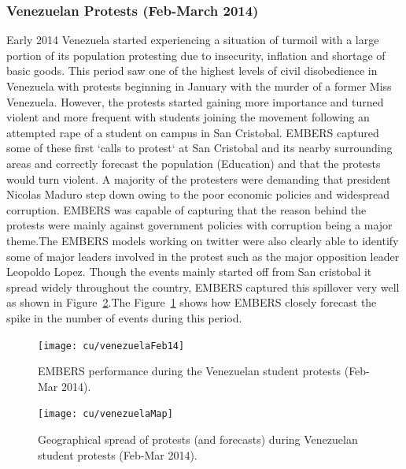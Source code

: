 \subsubsection*{Venezuelan Protests (Feb-March 2014)}
Early 2014 Venezuela started experiencing a situation of turmoil with a
large portion of its population protesting due to insecurity, inflation
and shortage of basic goods. This period saw one of the highest levels of
civil disobedience in Venezuela with protests beginning in January with the murder
of a former Miss Venezuela. However, the protests started gaining more importance
 and turned violent and more frequent with students joining the movement following an
attempted rape of a student on campus in San Cristobal. EMBERS captured
some of these first `calls to protest` at San Cristobal and its nearby surrounding areas
 and correctly forecast the population (Education) and that the protests would turn violent.
A majority of the protesters were demanding that president Nicolas Maduro step down owing
to the poor economic policies and widespread corruption. EMBERS was capable of capturing
that the reason behind the protests were mainly against government policies with corruption being
a major theme.The EMBERS models working on twitter were also clearly able to identify some of major
leaders involved in the protest such as the major opposition leader Leopoldo Lopez.
Though the events mainly started off from San cristobal it spread widely throughout the country, EMBERS
captured this spillover very well as shown in Figure~\ref{fig:venezuelaMap}.The
Figure~\ref{fig:venezuelaMarch14}
shows how EMBERS closely forecast the spike in the number of events  during this period.
\begin{figure}[H]
\centering
\texttt{[image: cu/venezuelaFeb14]}
\caption{EMBERS performance during the Venezuelan student protests (Feb-Mar 2014).}
\label{fig:venezuelaMarch14}
\end{figure}

\begin{figure}[H]
\centering
\texttt{[image: cu/venezuelaMap]}
\caption{Geographical spread of protests (and forecasts) during
Venezuelan student protests (Feb-Mar 2014).}
\label{fig:venezuelaMap}
\end{figure}

